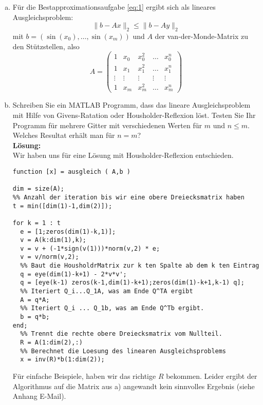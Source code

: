 \documentclass[11pt,a4paper,ngerman]{article}
\begin{document}
\begin{enumerate}[a)]
\item Für die Bestapproximationsaufgabe \ref{eq:1} ergibt sich als lineares Ausgleichsproblem:
\begin{equation}
\|b - Ax \|_2 \leq \|b - Ay \|_2
\end{equation}
mit $b = \left(\sin(x_0),\ldots,\sin(x_m) \right)$ und $A$ der van-der-Monde-Matrix zu den Stützstellen, also
$$ A = \left( \begin{array}{ccccc} 1 & x_0 & x_0^2 & \ldots & x_0^n \\
  1 & x_1 & x_1^2 & \ldots & x_1^n \\
  \vdots & \vdots & \vdots &\vdots & \vdots \\
  1 & x_m & x_m^2 & \ldots & x_m^n \end{array} \right)$$
\item Schreiben Sie ein MATLAB Programm, dass das lineare Ausgleichsproblem mit Hilfe von Givens-Ratation oder Housholder-Reflexion löst.
Testen Sie Ihr Programm für mehrere Gitter mit verschiedenen Werten für $m$ und $n \leq m$. Welches Resultat erhält man für $n = m$?\\

\textbf{Lösung:}\\

Wir haben uns für eine Lösung mit Housholder-Reflexion entschieden.

\begin{lstlisting}
function [x] = ausgleich ( A,b )

dim = size(A);
%% Anzahl der iteration bis wir eine obere Dreiecksmatrix haben
t = min([dim(1)-1,dim(2)]);

for k = 1 : t
  e = [1;zeros(dim(1)-k,1)];
  v = A(k:dim(1),k);
  v = v + (-1*sign(v(1)))*norm(v,2) * e;
  v = v/norm(v,2);
  %% Baut die HousholdrMatrix zur k ten Spalte ab dem k ten Eintrag
  q = eye(dim(1)-k+1) - 2*v*v';
  q = [eye(k-1) zeros(k-1,dim(1)-k+1);zeros(dim(1)-k+1,k-1) q];
  %% Iteriert Q_i...Q_1A, was am Ende Q^TA ergibt
  A = q*A;
  %% Iteriert Q_i ... Q_1b, was am Ende Q^Tb ergibt.
  b = q*b;
end;
  %% Trennt die rechte obere Dreiecksmatrix vom Nullteil.
  R = A(1:dim(2),:)
  %% Berechnet die Loesung des linearen Ausgleichsproblems
  x = inv(R)*b(1:dim(2));
\end{lstlisting}

Für einfache Beispiele, haben wir das richtige $R$ bekommen. Leider ergibt
der Algorithmus auf die Matrix aus a) angewandt kein sinnvolles Ergebnis (siehe Anhang E-Mail).

\end{enumerate}
\end{document}
